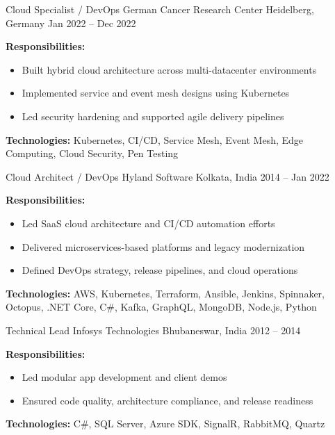 \begin{cventries}
\cventry
  {Cloud Specialist / DevOps}
  {German Cancer Research Center}
  {Heidelberg, Germany}
  {Jan 2022 – Dec 2022}
  {
    \begin{cvitems}
      \item {\textbf{Responsibilities:}
        \begin{itemize}
          \item Built hybrid cloud architecture across multi-datacenter environments
          \item Implemented service and event mesh designs using Kubernetes
          \item Led security hardening and supported agile delivery pipelines\\
        \end{itemize}
      }
      \item {\textbf{Technologies:} Kubernetes, CI/CD, Service Mesh, Event Mesh, Edge Computing, Cloud Security, Pen Testing}\\
    \end{cvitems}
  }

\cventry
  {Cloud Architect / DevOps}
  {Hyland Software}
  {Kolkata, India}
  { 2014 – Jan 2022}
  {
    \begin{cvitems}
      \item {\textbf{Responsibilities:}
        \begin{itemize}
          \item Led SaaS cloud architecture and CI/CD automation efforts
          \item Delivered microservices-based platforms and legacy modernization
          \item Defined DevOps strategy, release pipelines, and cloud operations\\
        \end{itemize}
      }
      \item {\textbf{Technologies:} AWS, Kubernetes, Terraform, Ansible, Jenkins, Spinnaker, Octopus, .NET Core, C\#, Kafka, GraphQL, MongoDB, Node.js, Python}\\
    \end{cvitems}
  }

\cventry
  {Technical Lead}
  {Infosys Technologies}
  {Bhubaneswar, India}
  {2012 – 2014}
  {
    \begin{cvitems}
      \item {\textbf{Responsibilities:}
        \begin{itemize}
          \item Led modular app development and client demos
          \item Ensured code quality, architecture compliance, and release readiness\\
        \end{itemize}
      }
      \item {\textbf{Technologies:} C\#, SQL Server, Azure SDK, SignalR, RabbitMQ, Quartz}\\
    \end{cvitems}
  }


\end{cventries}
